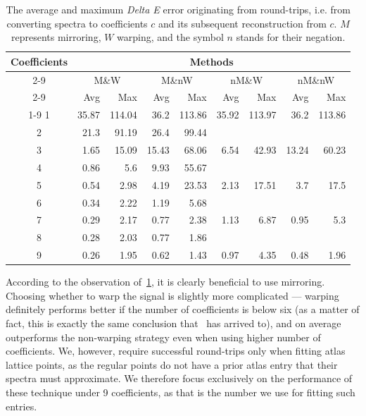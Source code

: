 \begin{table}[t]
	\centering
	\begin{tabular}{crrrrrrrr}
		\toprule
		\multirow{4}{*}{Coefficients} &
		\multicolumn{8}{c}{Methods} \\
		\cmidrule(lr){2-9}
		&\multicolumn{2}{c}{M\&W} &
		\multicolumn{2}{c}{M\&nW} &
		\multicolumn{2}{c}{nM\&W} &
		\multicolumn{2}{c}{nM\&nW}\\
		\cmidrule(lr){2-9}
		& Avg & Max & Avg & Max & Avg & Max & Avg & Max \\
		\cmidrule(lr){1-9}
		1&35.87&114.04&36.2&113.86&35.92&113.97&36.2&113.86\\
		2&21.3&91.19&26.4&99.44&\textemdash&\textemdash&\textemdash&\textemdash\\
		3&1.65&15.09&15.43&68.06&6.54&42.93&13.24&60.23\\
		4&0.86&5.6&9.93&55.67&\textemdash&\textemdash&\textemdash&\textemdash\\
		5&0.54&2.98&4.19&23.53&2.13&17.51&3.7&17.5\\
		6&0.34&2.22&1.19&5.68&\textemdash&\textemdash&\textemdash&\textemdash\\
		7&0.29&2.17&0.77&2.38&1.13&6.87&0.95&5.3\\
		8&0.28&2.03&0.77&1.86&\textemdash&\textemdash&\textemdash&\textemdash\\
		9&0.26&1.95&0.62&1.43&0.97&4.35&0.48&1.96\\
		\bottomrule
	\end{tabular}
	\caption{The average and maximum \emph{Delta E} error originating from round-trips, i.e. from converting spectra to coefficients $c$ and its subsequent reconstruction from $c$. $M$ represents mirroring, $W$ warping, and the symbol $n$ stands for their negation.}
	\label{table:comparisonMomentTechnique}
\end{table}

According to the observation of~\cref{table:comparisonMomentTechnique}, it is clearly beneficial to use mirroring. Choosing whether to warp the signal is slightly more complicated --- warping definitely performs better if the number of coefficients is below six (as a matter of fact, this is exactly the same conclusion that~\citet{trigonometricMomentsPresentation} has arrived to), and on average outperforms the non-warping strategy even when using higher number of coefficients. We, however, require successful round-trips only when fitting atlas lattice points, as the regular points do not have a prior atlas entry that their spectra must approximate. We therefore focus exclusively on the performance of these technique under 9 coefficients, as that is the number we use for fitting such entries. 

